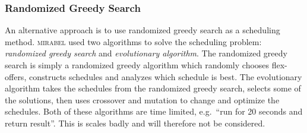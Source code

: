 \FloatBarrier

\subsubsection{Randomized Greedy Search}\label{sec:randomsearch}
An alternative approach is to use randomized greedy search as a scheduling method. \textsc{mirabel} used two algorithms to solve the scheduling problem: \emph{randomized greedy search} and \emph{evolutionary algorithm}. The randomized greedy search is simply a randomized greedy algorithm which randomly chooses flex-offers, constructs schedules and analyzes which schedule is best. The evolutionary algorithm takes the schedules from the randomized greedy search, selects some of the solutions, then uses crossover and mutation to change and optimize the schedules. Both of these algorithms are time limited, e.g.\ ``run for 20 seconds and return result''. This is scales badly and will therefore not be considered.
